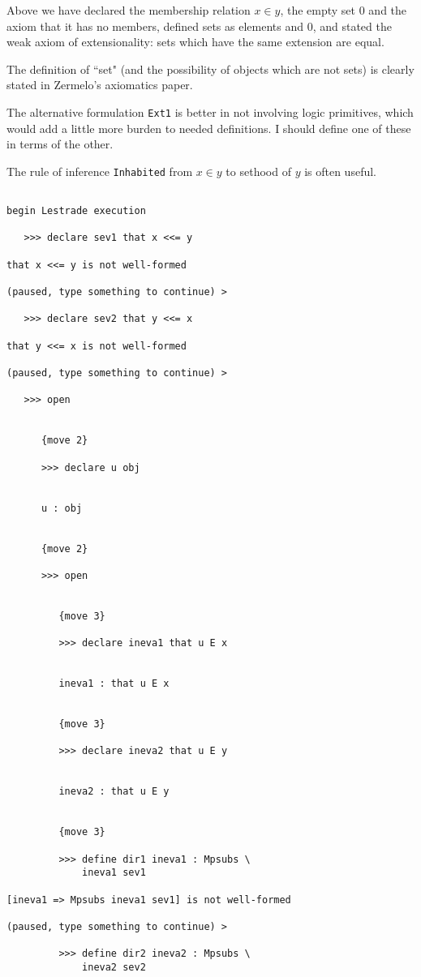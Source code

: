\documentclass[12pt]{article}
\begin{document}
Above we have declared the membership relation $x \in y$, the empty set 0 and the axiom that it has no members, defined sets as elements and 0, and stated the weak axiom of extensionality:  sets which have the same extension are equal.

The definition of ``set" (and the possibility of objects which are not sets) is clearly stated in Zermelo's axiomatics paper.

The alternative formulation {\tt Ext1} is better in not involving logic primitives, which would add a little more burden to needed definitions.  I should define one of these in terms of the other.

The  rule of inference {\tt Inhabited} from $x \in y$ to sethood of $y$ is often useful.

\begin{verbatim}

begin Lestrade execution

   >>> declare sev1 that x <<= y

that x <<= y is not well-formed

(paused, type something to continue) >

   >>> declare sev2 that y <<= x

that y <<= x is not well-formed

(paused, type something to continue) >

   >>> open


      {move 2}

      >>> declare u obj


      u : obj


      {move 2}

      >>> open


         {move 3}

         >>> declare ineva1 that u E x


         ineva1 : that u E x


         {move 3}

         >>> declare ineva2 that u E y


         ineva2 : that u E y


         {move 3}

         >>> define dir1 ineva1 : Mpsubs \
             ineva1 sev1

[ineva1 => Mpsubs ineva1 sev1] is not well-formed

(paused, type something to continue) >

         >>> define dir2 ineva2 : Mpsubs \
             ineva2 sev2


\end{verbatim}
\end{document}
